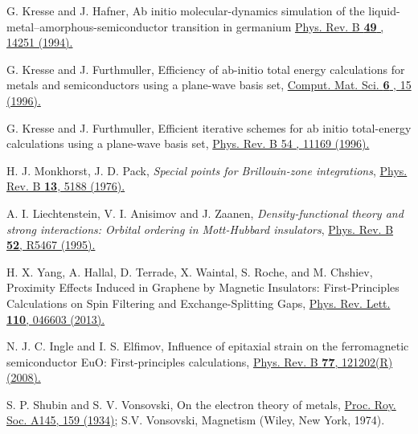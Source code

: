 \documentclass[10pt,pr,twocolumn,showpacs,amssymb,floatfix,superscriptaddress]{revtex4-1}
\begin{document}
\begin{thebibliography}{999}
 G. Kresse and J. Hafner, 
Ab initio molecular-dynamics simulation of the liquid-metal–amorphous-semiconductor transition in germanium
\href{https://journals.aps.org/prb/abstract/10.1103/PhysRevB.49.14251}{Phys. Rev. B {\bf 49} , 14251 (1994).}


G. Kresse and J. Furthmuller, 
Efficiency of ab-initio total energy calculations for metals and semiconductors using a plane-wave basis set, 
\href{https://www.sciencedirect.com/science/article/abs/pii/0927025696000080}{Comput. Mat. Sci. {\bf 6} , 15 (1996).} 

G. Kresse and J. Furthmuller, 
Efficient iterative schemes for ab initio total-energy calculations using a plane-wave basis set,
\href{https://journals.aps.org/prb/abstract/10.1103/PhysRevB.54.11169}{Phys. Rev. B {\bf }54 , 11169 (1996).}




H. J. Monkhorst, J. D. Pack, \emph{Special points for Brillouin-zone integrations}, 
\href{https://journals.aps.org/prb/abstract/10.1103/PhysRevB.13.5188}{Phys. Rev. B \textbf{13}, 5188 (1976).}

A. I. Liechtenstein, V. I. Anisimov and J. Zaanen, \emph{Density-functional theory and strong interactions: Orbital ordering in Mott-Hubbard insulators}, 
\href{https://journals.aps.org/prb/abstract/10.1103/PhysRevB.52.R5467}{Phys. Rev. B \textbf{52}, R5467 (1995).}



H. X. Yang, A. Hallal, D. Terrade, X. Waintal, S. Roche, and M. Chshiev,
Proximity Effects Induced in Graphene by Magnetic Insulators: First-Principles Calculations on Spin Filtering and Exchange-Splitting Gaps, 
\href{https://journals.aps.org/prl/abstract/10.1103/PhysRevLett.110.046603}{Phys. Rev. Lett. {\bf 110}, 046603 (2013).}

 N. J. C. Ingle and I. S. Elfimov, 
Influence of epitaxial strain on the ferromagnetic semiconductor EuO: First-principles calculations, 
\href{https://journals.aps.org/prb/abstract/10.1103/PhysRevB.77.121202}{Phys. Rev. B {\bf 77}, 121202(R) (2008).}


 S. P. Shubin and S. V. Vonsovski,
On the electron theory of metals, 
\href{https://royalsocietypublishing.org/doi/10.1098/rspa.1934.0089}{Proc. Roy. Soc. A145, 159 (1934)}; 
S.V. Vonsovski, Magnetism (Wiley, New York, 1974).




\end{thebibliography}
\end{document}
